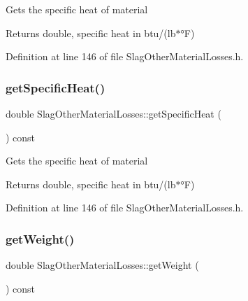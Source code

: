 Gets the specific heat of material

\begin{DoxyReturn}{Returns}
double, specific heat in btu/(lb$\ast$°F) 
\end{DoxyReturn}


Definition at line 146 of file Slag\+Other\+Material\+Losses.\+h.

\mbox{\label{class_slag_other_material_losses_aa68e92bdf836a4112c55344f897f2649}} 
\subsubsection{\texorpdfstring{get\+Specific\+Heat()}{getSpecificHeat()}\hspace{0.1cm}{\footnotesize\ttfamily [3/3]}}
{\footnotesize\ttfamily double Slag\+Other\+Material\+Losses\+::get\+Specific\+Heat (\begin{DoxyParamCaption}{ }\end{DoxyParamCaption}) const\hspace{0.3cm}{\ttfamily [inline]}}

Gets the specific heat of material

\begin{DoxyReturn}{Returns}
double, specific heat in btu/(lb$\ast$°F) 
\end{DoxyReturn}


Definition at line 146 of file Slag\+Other\+Material\+Losses.\+h.

\mbox{\label{class_slag_other_material_losses_a9b62b86eb4ec919d70dd8899ef5d3513}} 
\subsubsection{\texorpdfstring{get\+Weight()}{getWeight()}\hspace{0.1cm}{\footnotesize\ttfamily [1/3]}}
{\footnotesize\ttfamily double Slag\+Other\+Material\+Losses\+::get\+Weight (\begin{DoxyParamCaption}{ }\end{DoxyParamCaption}) const\hspace{0.3cm}{\ttfamily [inline]}}


